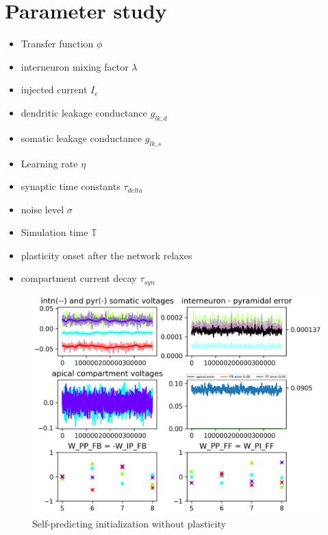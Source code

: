 \documentclass[12pt,a4paper,titlepage]{report}
\begin{document}
\section{Parameter study}
\begin{itemize}

 \item Transfer function $\phi$
 \item interneuron mixing factor $\lambda$
 \item injected current $I_e$
 \item dendritic leakage conductance $g_{lk,d}$
 \item somatic leakage conductance $g_{lk,s}$
 \item Learning rate $\eta$
 \item synaptic time constants $\tau_{delta}$
 \item noise level $\sigma$
 \item Simulation time $\mathbb{T}$
 \item plasticity onset after the network relaxes
 \item compartment current decay $\tau_{syn}$

\end{itemize}



\begin{figure}
	\centerline{\includegraphics[width={1\linewidth}]{self_pred_static.png}}
	\caption{Self-predicting initialization without plasticity}
\end{figure}
\end{document}
